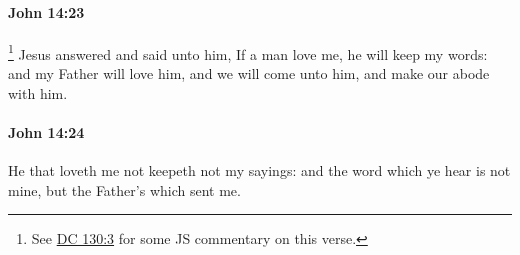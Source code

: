 		\paragraph{John 14:23} %
			\label{JOHN-14-23}

				\footnote{%
					See \hyperref[DC130-3]{DC 130:3} for some JS commentary on this verse.
					}%
			Jesus answered and said unto him, If a man love me, he will keep my words: and my Father will love him, and we will come unto him, and make our abode with him.

			\begin{framed}
				\scriptsize
				\begin{compactdesc}
					\item[SBLG] 
				\end{compactdesc}
			\end{framed}

		\paragraph{John 14:24} %
			\label{JOHN-14-24}

			He that loveth me not keepeth not my sayings: and the word which ye hear is not mine, but the Father's which sent me.

